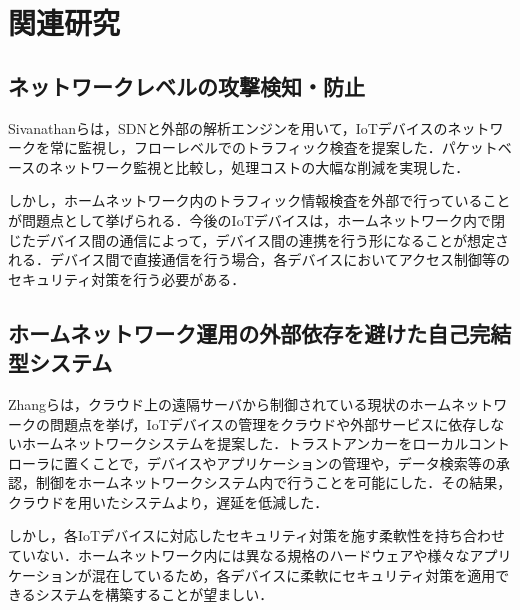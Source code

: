 \documentclass[Japanese]{dicomopapers}
\begin{document}


\section{関連研究}
\subsection{ネットワークレベルの攻撃検知・防止}
Sivanathanらは，SDNと外部の解析エンジンを用いて，IoTデバイスのネットワークを常に監視し，フローレベルでのトラフィック検査を提案した\cite{lowcost}．パケットベースのネットワーク監視と比較し，処理コストの大幅な削減を実現した．\par
しかし，ホームネットワーク内のトラフィック情報検査を外部で行っていることが問題点として挙げられる．今後のIoTデバイスは，ホームネットワーク内で閉じたデバイス間の通信によって，デバイス間の連携を行う形になることが想定される\cite{d2d}．デバイス間で直接通信を行う場合，各デバイスにおいてアクセス制御等のセキュリティ対策を行う必要がある．


\subsection{ホームネットワーク運用の外部依存を避けた自己完結型システム}
Zhangらは，クラウド上の遠隔サーバから制御されている現状のホームネットワークの問題点を挙げ，IoTデバイスの管理をクラウドや外部サービスに依存しないホームネットワークシステムを提案した\cite{sover}．トラストアンカーをローカルコントローラに置くことで，デバイスやアプリケーションの管理や，データ検索等の承認，制御をホームネットワークシステム内で行うことを可能にした．その結果，クラウドを用いたシステムより，遅延を低減した．\par
しかし，各IoTデバイスに対応したセキュリティ対策を施す柔軟性を持ち合わせていない．ホームネットワーク内には異なる規格のハードウェアや様々なアプリケーションが混在しているため，各デバイスに柔軟にセキュリティ対策を適用できるシステムを構築することが望ましい．
\end{document}
